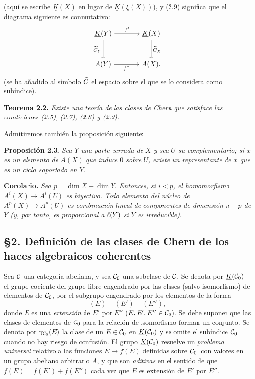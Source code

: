 (aquí se escribe $\underline{K}(X)$ en lugar de $\underline{K}(\xi(X))$), y (2.9) significa que el diagrama siguiente es conmutativo:
\[
\begin{tikzcd}[column sep=large,row sep=large]
\sisi{K(Y)}{\underline K(Y)} \arrow[r,"f^!"] \arrow[d,"\Ctil_Y"'] & \sisi{K(X)}{\underline K(X)} \arrow[d,"\Ctil_X"]\\
A(Y) \arrow[r,"f^*"'] & A(X).
\end{tikzcd}
\]
(se ha añadido al símbolo $\Ctil$ el espacio sobre el que se lo considera como subíndice).

\textbf{Teorema 2.2.} \emph{Existe una teoría de las clases de Chern que satisface las condiciones (2.5), (2.7), (2.8) y (2.9).}

Admitiremos también la proposición siguiente:

\textbf{Proposición 2.3.} \emph{Sea $Y$ una parte cerrada de $X$ y sea $U$ su complementario; si $x$ es un elemento de $A(X)$ que induce $0$ sobre $U$, existe un representante de $x$ que es un ciclo soportado en $Y$.}

\textbf{Corolario.} \emph{Sea $p=\dim X-\dim Y$. Entonces, si $i<p$, el homomorfismo $A^i(X)\longrightarrow A^i(U)$ es biyectivo. Todo elemento del núcleo de $A^p(X)\longrightarrow A^p(U)$ es combinación lineal de componentes de dimensión $n-p$ de $Y$ (y, por tanto, es proporcional a $\ellc(Y)$ si $Y$ es irreducible)}.

\subsection*{\S 2. Definición de las clases de Chern de los haces algebraicos coherentes}

Sea $\cC$ una categoría abeliana, y sea $\cC_0$ una subclase de $\cC$. Se denota por $\sisi{K(\cC_0)}{\underline{K}(\cC_0)}$ el grupo cociente del grupo libre engendrado por las clases (salvo isomorfismo) de elementos de $\cC_0$, por el subgrupo engendrado por los elementos de la forma
\[
(E)-(E')-(E''),
\]
donde $E$ es una \emph{extensión} de $E'$ por $E''$ ($E,E',E''\in\cC_0$). Se debe suponer que las clases de elementos de $\cC_0$ para la relación de isomorfismo forman un conjunto. Se denota por $\gamma_{\cC_0}(E)$ la clase de un $E\in\cC_0$ en $\sisi{K(\cC_0)}{\underline{K}(\cC_0)}$ y se omite el subíndice $\cC_0$ cuando no hay riesgo de confusión. El grupo $\underline{K}(\cC_0)$ resuelve un \emph{problema universal} relativo a las funciones $E\longrightarrow f(E)$ definidas sobre $\cC_0$, con valores en un grupo abeliano arbitrario $A$, y que son \emph{aditivas} en el sentido de que $f(E)=f(E')+f(E'')$ cada vez que $E$ es extensión de $E'$ por $E''$.

